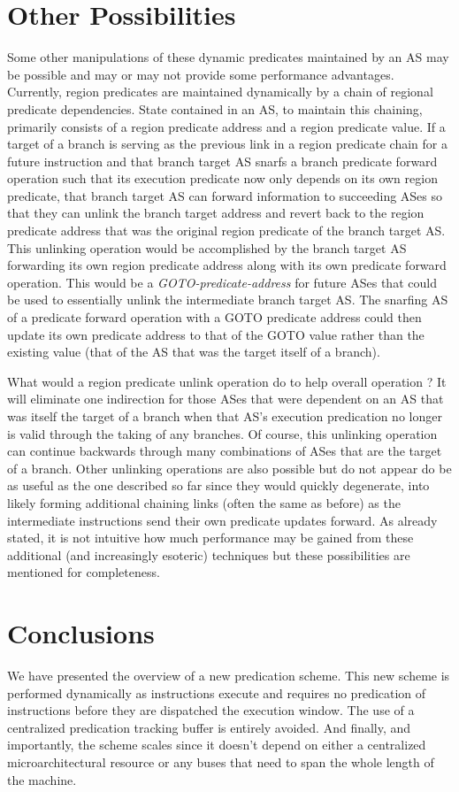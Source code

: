\documentclass[10pt,dvips]{article}
\begin{document}
\section{Other Possibilities}
%
Some other manipulations of these dynamic predicates maintained by an
AS may be possible and may or may not provide some performance
advantages.  Currently, region predicates are maintained dynamically by
a chain of regional predicate dependencies.  State contained in an
AS, to maintain this chaining, primarily consists of 
a region predicate address and a region
predicate value.  If a target of a branch is serving as the previous
link in a region predicate chain for a future instruction and that
branch target AS snarfs a branch predicate forward operation such that
its execution predicate now only depends on its own region predicate,
that branch target AS can forward information to succeeding ASes so
that they can unlink the branch target address and revert back to the
region predicate address that was the original region predicate of the
branch target AS.  This unlinking operation would be accomplished by the
branch target AS forwarding its own region predicate address along with
its own predicate forward operation.  
This would be a \textit{GOTO-predicate-address}
for future ASes that could be used to essentially unlink the
intermediate branch target AS.  The snarfing AS of a predicate forward
operation with a GOTO predicate address could then update its
own predicate address to that of the GOTO value rather than the
existing value (that of the AS that was the target itself of a
branch).  

What would a region predicate unlink operation do to help overall
operation ?  It will eliminate one indirection for those ASes that were
dependent on an AS that was itself the target of a branch when that AS's
execution predication no longer is valid through the taking of any
branches.  Of course, this unlinking operation can continue backwards
through many combinations of ASes that are the target of a branch.
Other unlinking operations are also possible but do not appear do be as
useful as the one described so far since they would quickly degenerate,
into likely forming additional chaining links 
(often the same as before) as the
intermediate instructions send their own predicate updates forward.
As already stated, it is not intuitive how much performance may
be gained from these additional (and increasingly esoteric)
techniques but these possibilities are mentioned for completeness.
%
\section{Conclusions}
%
We have presented the overview of a new predication scheme.
This new scheme is performed dynamically as instructions
execute and requires no predication of instructions before they
are dispatched the execution window. 
The use of a centralized predication tracking buffer is entirely
avoided.
And finally, and importantly, the scheme scales since it
doesn't depend on either a centralized microarchitectural resource
or any buses that need to span the whole length of the machine.
%
%
%


\end{document}
